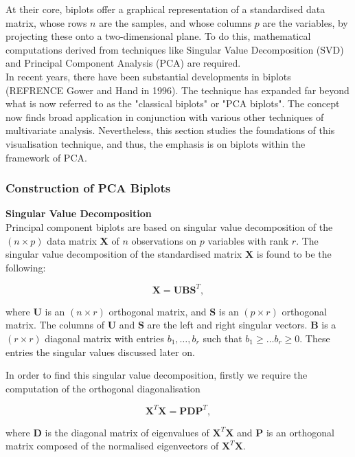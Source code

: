 \documentclass{article}\usepackage[]{graphicx}\usepackage[]{xcolor}
\numberwithin{equation}{section}
\begin{document}
{\noindent At their core, biplots offer a graphical representation of a standardised data matrix, whose rows \(n\) are the samples, and whose columns \(p\) are the variables, by projecting these onto a two-dimensional plane. To do this, mathematical computations derived from techniques like Singular Value Decomposition (SVD) and Principal Component Analysis (PCA) are required.\\

\noindent In recent years, there have been substantial developments in biplots (REFRENCE Gower and Hand in 1996). The technique has expanded far beyond what is now referred to as the "classical biplots" or "PCA biplots". The concept now finds broad application in conjunction with various other techniques of multivariate analysis. Nevertheless, this section studies the foundations of this visualisation technique, and thus, the emphasis is on biplots within the framework of PCA.

\subsubsection{Construction of PCA Biplots}

\noindent \textbf{Singular Value Decomposition}\\
\noindent Principal component biplots are based on singular value decomposition of the $(n \times p)$ data matrix $\mathbf{X}$ of $n$ observations on $p$ variables with rank $r$. The singular value decomposition of the standardised matrix $\mathbf{X}$ is found to be the following:

\[\mathbf{X} = \mathbf{U}\mathbf{B}\mathbf{S}^{T}, \]

\noindent where $\mathbf{U}$ is an $(n \times r)$ orthogonal matrix, and $\mathbf{S}$ is an $(p \times r)$ orthogonal matrix. The columns of $\mathbf{U}$ and $\mathbf{S}$ are the left and right singular vectors. $\mathbf{B}$ is a $(r \times r)$ diagonal matrix with entries $b_1, \ldots, b_r$ such that $b_1 \geq \dots b_r \geq 0$. These entries the singular values discussed later on. %

\noindent In order to find this singular value decomposition, firstly we require the computation of the orthogonal diagonalisation  

\[
\mathbf{X}^T\mathbf{X}=\mathbf{PDP}^T,
\] 

\noindent where $\mathbf{D}$ is the diagonal matrix of eigenvalues of $\mathbf{X}^T\mathbf{X}$ and $\mathbf{P}$ is an orthogonal matrix composed of the normalised eigenvectors of $\mathbf{X}^T\mathbf{X}$.\\

}
\end{document}
